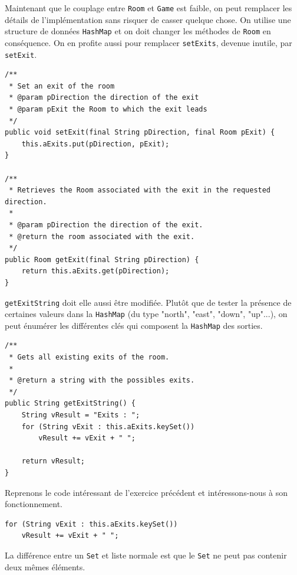 \documentclass[a4paper,12pt]{report}
\begin{document}
\begin{exercise}[subtitle=HashMap et setExit]

Maintenant que le couplage entre \verb|Room| et \verb|Game| est faible, on peut remplacer les détails de l'implémentation sans risquer de casser quelque chose. On utilise une structure de données \verb|HashMap| et on doit changer les méthodes de \verb|Room| en conséquence. On en profite aussi pour remplacer \verb|setExits|, devenue inutile, par \verb|setExit|.

\begin{verbatim}
/**
 * Set an exit of the room
 * @param pDirection the direction of the exit
 * @param pExit the Room to which the exit leads
 */
public void setExit(final String pDirection, final Room pExit) {
    this.aExits.put(pDirection, pExit);
}

/**
 * Retrieves the Room associated with the exit in the requested direction.
 *
 * @param pDirection the direction of the exit.
 * @return the room associated with the exit.
 */
public Room getExit(final String pDirection) {
    return this.aExits.get(pDirection);
}
\end{verbatim}
\end{exercise}

\begin{exercise}[subtitle=keySet]

\verb|getExitString| doit elle aussi être modifiée. Plutôt que de tester la présence de certaines valeurs dans la \verb|HashMap| (du type "north", "east", "down", "up"...), on peut énumérer les différentes clés qui composent la \verb|HashMap| des sorties.

\begin{verbatim}
/**
 * Gets all existing exits of the room.
 *
 * @return a string with the possibles exits.
 */
public String getExitString() {
    String vResult = "Exits : ";
    for (String vExit : this.aExits.keySet())
        vResult += vExit + " ";

    return vResult;
}
\end{verbatim}
\end{exercise}

\begin{exercise}[subtitle=Fonctionnement de keySet]

Reprenons le code intéressant de l'exercice précédent et intéressons-nous à son fonctionnement.

\begin{verbatim}
for (String vExit : this.aExits.keySet())
    vResult += vExit + " ";
\end{verbatim}

La différence entre un \verb|Set| et liste normale est que le \verb|Set| ne peut pas contenir deux mêmes éléments.
\end{exercise}
\end{document}
